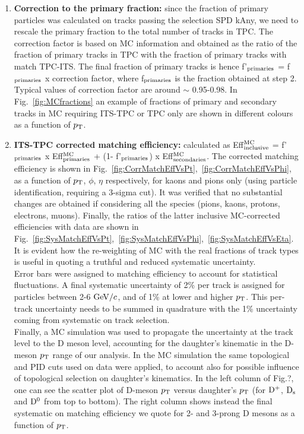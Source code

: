 \begin{enumerate}
\item {\bf Correction to the primary fraction:} since the fraction of primary
 particles was calculated on tracks passing the selection SPD kAny, we
need to rescale the primary fraction to the total number of tracks in TPC. 
The correction factor is based on MC information and obtained as 
the ratio of the fraction of primary tracks in TPC with the fraction of primary
 tracks with match TPC-ITS. The final fraction of primary tracks is hence
  f'$_{\rm primaries}$ = f$_{\rm primaries}$ x correction factor, 
  where f$_{\rm primaries}$ is the fraction obtained at step 2. 
  Typical values of correction factor are around $\sim$ 0.95-0.98. 
  In Fig.~\ref{fig:MCfractions} an example of fractions of primary 
  and secondary tracks in MC requiring ITS-TPC or TPC only are 
  shown in different colours as a function of $p_{\rm T}$.

\item {\bf ITS-TPC corrected matching efficiency:} calculated 
as  Eff$^{\rm MC}_{\rm inclusive}$ = f'$_{\rm primaries}$ x Eff$^{\rm MC}_{\rm primaries}$ + (1- f'$_{\rm primaries}$) x Eff$^{\rm MC}_{\rm secondaries}$. The corrected matching efficiency 
is shown in Fig.~\ref{fig:CorrMatchEffVsPt},~\ref{fig:CorrMatchEffVsPhi}, 
as a function of $p_{\rm T}$, $\phi$, $\eta$ respectively, for kaons and 
pions only (using particle identification, requiring a 3-sigma cut). 
It was verified that no substantial changes are obtained if 
considering all the species (pions, kaons, protons, electrons, muons). 
Finally, the ratios of the latter inclusive MC-corrected efficiencies with
 data are shown in Fig.~\ref{fig:SysMatchEffVsPt},~\ref{fig:SysMatchEffVsPhi},~\ref{fig:SysMatchEffVsEta}. 
 It is evident how the re-weighting of MC with the real fractions 
of track types is useful in quoting a truthful and reduced systematic uncertainty. \\ 
Error bars were assigned to matching efficiency to account for statistical fluctuations.
A final systematic uncertainty of 2\% per track is assigned for particles 
between 2-6 $\mathrm{GeV}/c$, and of 1\% at lower and higher $p_{\rm T}$.
This per-track uncertainty needs to be summed in quadrature with the 
1\% uncertainty coming from systematic on track selection. \\
Finally, a MC simulation was used to propagate the uncertainty at the 
track level to the D meson level, accounting for the daughter's 
kinematic in the D-meson $p_{\rm T}$ range of our analysis. In the MC 
simulation the same topological and PID cuts used on data were 
applied, to account also for possible influence of topological selection
 on daughter's kinematics. In the left column of 
 Fig.?, one can see the 
scatter plot of D-meson $p_{\rm T}$ versus daughter's $p_{\rm T}$ 
(for ${\rm D^+}$, ${\rm D_s}$ and ${\rm D^0}$ from top to bottom). 
The right column shows instead the final systematic on matching
 efficiency we quote for 2- and 3-prong D mesons as a function of $p_{\rm T}$.
\end{enumerate}

